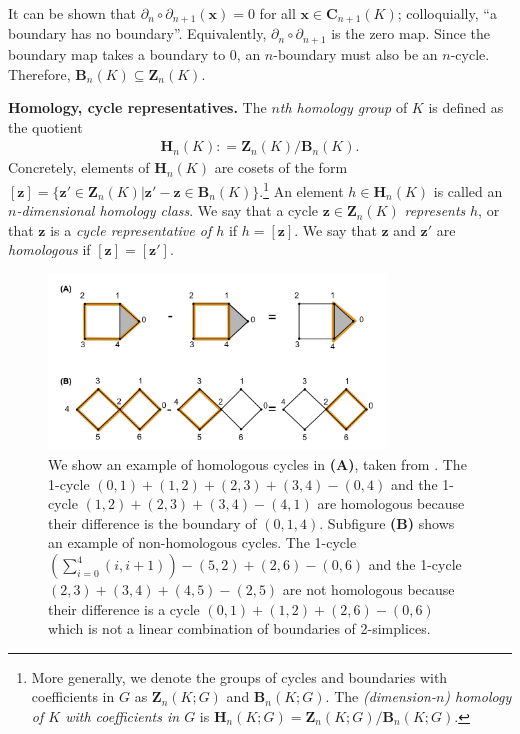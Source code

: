 \documentclass[11pt,onecolumn]{article}
\newcommand{\Chains}{\mathbf{C}}
\newcommand{\Homologies}[0]{\mathbf{H}}
\newcommand{\Boundaries}[0]{\mathbf{B}}
\newcommand{\Cycles}[0]{\mathbf{Z}}
\newcommand{\optimalrep}{\mathbf{x}}
\newcommand{\cycle}{{\mathbf z}}
\theoremstyle{plain}
\theoremstyle{definition}
\begin{document}
It can be shown that $\partial_n \circ \partial_{n+1}(\optimalrep) = 0$ for all $\optimalrep \in \Chains_{n+1}(K)$; colloquially,  ``a boundary has no boundary''. Equivalently,  $\partial_n \circ \partial_{n+1}$ is the zero map.
Since the boundary map takes a boundary to $0$, an $n$-boundary must also be an $n$-cycle. Therefore, $\Boundaries_n(K) \subseteq \Cycles_n(K)$. 




\noindent \textbf{Homology, cycle representatives.} The \emph{$n$th homology group} of $K$ is defined as  the quotient
    \begin{align*}
        \Homologies_n(K): = \Cycles_n(K) / \Boundaries_n(K).
    \end{align*}
Concretely, elements of $\Homologies_n(K)$ are cosets of the form $[\cycle] = \{ \cycle'  \in \Cycles_n(K) | \cycle' - \cycle \in \Boundaries_n(K)\}$.\footnote{More generally, we denote the groups of cycles and boundaries with coefficients in $G$ as $\Cycles_n(K; G)$ and $\Boundaries_n(K; G)$.  The \emph{(dimension-$n$) homology of $K$ with coefficients in $G$} is $\Homologies_n(K; G) = \Cycles_n(K; G) / \Boundaries_n(K; G)$.}  An element $h \in \Homologies_n(K)$ is called an \emph{$n$-dimensional homology class}.  We say that a cycle $\cycle \in \Cycles_n(K)$ \emph{represents} $h$, or that $\cycle$ is a \emph{cycle representative of $h$} if $h = [\cycle]$.  We say that $\cycle$ and $\cycle'$ are \emph{homologous} if $[\cycle] = [\cycle']$.


\begin{figure}[H]
\begin{center}
\includegraphics[width=0.8\textwidth]{figures/examplesorange.jpg} 
\end{center}
\caption{We show an example of homologous cycles in \textbf{(A)}, taken from \cite{TZH15}. The 1-cycle $(0,1) + (1,2) + (2,3) + (3,4) - (0,4)$ and the 1-cycle $(1,2) + (2,3) + (3,4) - (4,1)$ are homologous because their difference is the boundary of $(0,1,4)$. Subfigure \textbf{(B)} shows an example of non-homologous cycles. The 1-cycle $(\sum_{i=0}^4 (i, i+1))-(5,2)+(2,6)-(0,6)$ and the 1-cycle $(2,3) + (3,4)+(4,5)-(2,5)$ are not homologous because their difference is a cycle $(0,1)+(1,2)+(2,6)-(0,6)$ which is not a linear combination of boundaries of 2-simplices. } \label{fig:boundaryexample}
\end{figure}
\end{document}
